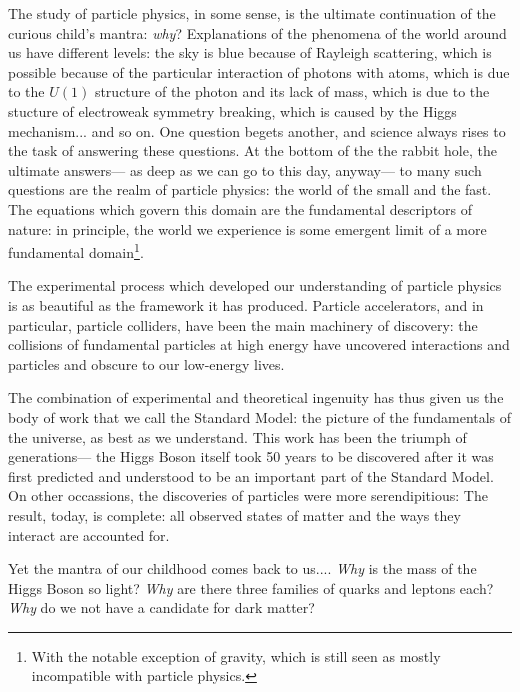 \label{chapter:introduction}


The study of particle physics, in some sense, is the ultimate continuation of the curious child's mantra: \textit{why}? Explanations of the phenomena of the world around us have different levels: the sky is blue because of Rayleigh scattering, which is possible because of the particular interaction of photons with atoms, which is due to the $U(1)$ structure of the photon and its lack of mass, which is due to the stucture of electroweak symmetry breaking, which is caused by the Higgs mechanism... and so on. One question begets another, and science always rises to the task of answering these questions. At the bottom of the the rabbit hole, the ultimate answers--- as deep as we can go to this day, anyway--- to many such questions are the realm of particle physics: the world of the small and the fast. The equations which govern this domain are the fundamental descriptors of nature: in principle, the world we experience is some emergent limit of a more fundamental domain\footnote{With the notable exception of gravity, which is still seen as mostly incompatible with particle physics.}.

The experimental process which developed our understanding of particle physics is as beautiful as the framework it has produced. Particle accelerators, and in particular, particle colliders, have been the main machinery of discovery: the collisions of fundamental particles at high energy have uncovered interactions and particles and obscure to our low-energy lives. 

The combination of experimental and theoretical ingenuity has thus given us the body of work that we call the Standard Model: the picture of the fundamentals of the universe, as best as we understand. This work has been the triumph of generations--- the Higgs Boson itself took 50 years to be discovered after it was first predicted and understood to be an important part of the Standard Model. On other occassions, the discoveries of particles were more serendipitious:  The result, today, is complete: all observed states of matter and the ways they interact are accounted for.

Yet the mantra of our childhood comes back to us.... \textit{Why} is the mass of the Higgs Boson so light? \textit{Why} are there three families of quarks and leptons each? \textit{Why} do we not have a candidate for dark matter?

